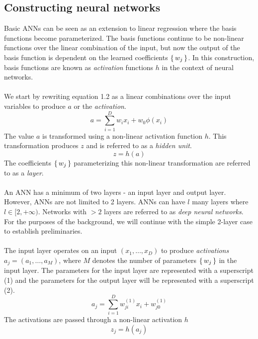 \subsection{Constructing neural networks}
Basic ANNs can be seen as an extension to linear regression where the basis functions become 
parameterized. The basis functions continue to be non-linear functions over the linear 
combination of the input, but now the output of the basis function is dependent on the 
learned coefficients $\set{w_j}$. In this construction, basis functions are known as 
\textit{activation} functions $h$ in the context of neural networks. 
\\\\
We start by rewriting equation 1.2 as a linear combinations over the input variables to 
produce $a$ or the \textit{activation}. 
\begin{equation}
    a = \sum_{i=1}^{D} w_{i}x_i + w_{0} \phi\left(x_i\right)
\end{equation}
The value $a$  is transformed using a non-linear activation function $h$. This 
transformation produces $z$ and is referred to as a \textit{hidden unit}. 
\begin{equation}
    z = h\left(a\right)
\end{equation}
The coefficients $\set{w_j}$ parameterizing this non-linear transformation
are referred to as a \textit{layer}.
\\\\
An ANN has a minimum of two layers - an input layer and output layer. 
However, ANNs are not limited to 2 layers.
ANNs can have $l$ many layers where $l \in [2, +\infty)$. 
Networks with $>2$ layers are referred to as \textit{deep neural networks}.
For the purposes of the background, we will continue with the simple 2-layer case to
establish preliminaries.
\\\\
The input layer operates on an input $(x_1, \ldots, x_D)$ to produce \textit{activations}
$a_j = (a_1, \ldots, a_M)$, where $M$ denotes the number of parameters $\set{w_j}$ in the 
input layer. 
The parameters for the input layer are represented with a superscript (1) and the parameters 
for the output layer will be represented with a superscript (2).
\begin{equation}
    a_j = \sum_{i=1}^{D} w_{ji}^{(1)}x_i + w_{j0}^{(1)}
\end{equation}
The activations are passed through a non-linear activation $h$
\begin{equation}
    z_j = h\left(a_{j}\right)
\end{equation}
